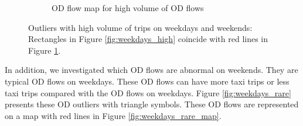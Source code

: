 \documentclass[a4paper,UKenglish]{lipics-v2016}
\begin{document}
\begin{figure}
\begin{subfigure}[b]{0.49\textwidth}
		\caption{OD flow map for high volume of OD flows}
		\label{fig:weekdays_high_map}
	\end{subfigure}
	\caption{Outliers with high volume of trips on weekdays and weekends: Rectangles in Figure \ref{fig:weekdays_high} coincide with red lines in Figure \ref{fig:weekdays_high_map}. }\label{fig:weekdays_high_OD_map}	
\end{figure}

In addition, we investigated which OD flows are abnormal on weekends. They are typical OD flows on weekdays. These OD flows can have more taxi trips or less taxi trips compared with the OD flows on weekdays. Figure \ref{fig:weekdays_rare} presents these OD outliers with triangle symbols. These OD flows are represented on a map with red lines in Figure \ref{fig:weekdays_rare_map}.
\end{document}
